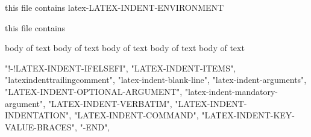 
this file contains latex-LATEX-INDENT-ENVIRONMENT

this file contains

\begin{myenv}
	body of text
	body of text
	body of text
	body of text
	body of text
\end{myenv}
"!-!LATEX-INDENT-IFELSEFI",
"LATEX-INDENT-ITEMS",
"latexindenttrailingcomment",
"latex-indent-blank-line",
"latex-indent-arguments",
"LATEX-INDENT-OPTIONAL-ARGUMENT",
"latex-indent-mandatory-argument",
"LATEX-INDENT-VERBATIM",
"LATEX-INDENT-INDENTATION",
"LATEX-INDENT-COMMAND",
"LATEX-INDENT-KEY-VALUE-BRACES",
"-END",
